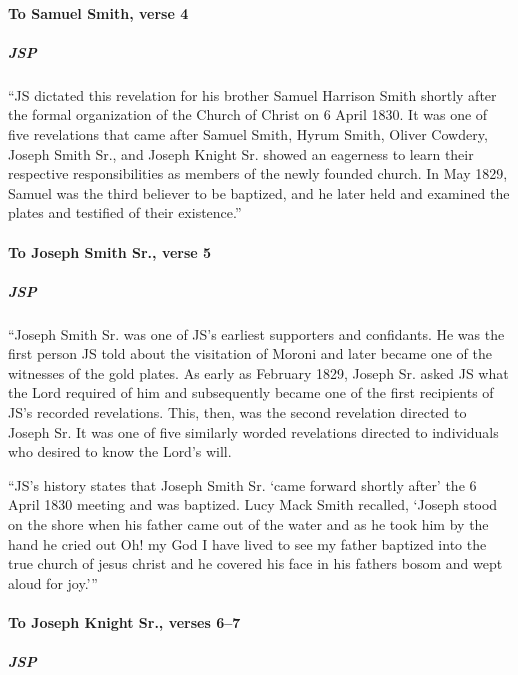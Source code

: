 		\paragraph{To Samuel Smith, verse 4}
		
			\subparagraph{JSP}
				
				``JS dictated this revelation for his brother Samuel Harrison Smith shortly after the formal organization of the Church of Christ on 6 April 1830. It was one of five revelations that came after Samuel Smith, Hyrum Smith, Oliver Cowdery, Joseph Smith Sr., and Joseph Knight Sr. showed an eagerness to learn their respective responsibilities as members of the newly founded church. In May 1829, Samuel was the third believer to be baptized, and he later held and examined the plates and testified of their existence.''
		
		\paragraph{To Joseph Smith Sr., verse 5}
		
			\subparagraph{JSP}
			
				``Joseph Smith Sr. was one of JS's earliest supporters and confidants. He was the first person JS told about the visitation of Moroni and later became one of the witnesses of the gold plates. As early as February 1829, Joseph Sr. asked JS what the Lord required of him and subsequently became one of the first recipients of JS's recorded revelations. This, then, was the second revelation directed to Joseph Sr. It was one of five similarly worded revelations directed to individuals who desired to know the Lord's will.
				
				``JS's history states that Joseph Smith Sr. `came forward shortly after' the 6 April 1830 meeting and was baptized. Lucy Mack Smith recalled, `Joseph stood on the shore when his father came out of the water and as he took him by the hand he cried out Oh! my God I have lived to see my father baptized into the true church of jesus christ and he covered his face in his fathers bosom and wept aloud for joy.'''
		
		\paragraph{To Joseph Knight Sr., verses 6--7}
		
			\subparagraph{JSP}
			
